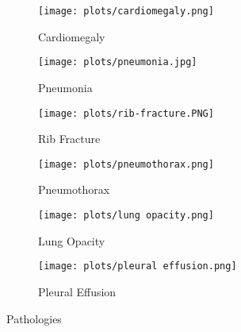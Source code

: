 \begin{figure}[htbp]
	\centering
	\begin{subfigure}[t]{0.3\textwidth}
		\texttt{[image: plots/cardiomegaly.png]}
		\caption{Cardiomegaly}
	\end{subfigure}
	\hfill
	\begin{subfigure}[t]{0.3\textwidth}
		\texttt{[image: plots/pneumonia.jpg]}
		\caption{Pneumonia}
	\end{subfigure}
	\hfill
	\begin{subfigure}[t]{0.3\textwidth}
		\texttt{[image: plots/rib-fracture.PNG]}
		\caption{Rib Fracture}
	\end{subfigure}
	\hfill
	\vskip 1pt
	\begin{subfigure}[t]{0.3\textwidth}
		\texttt{[image: plots/pneumothorax.png]}
		\caption{Pneumothorax}
	\end{subfigure}
	\hfill
	\begin{subfigure}[t]{0.3\textwidth}
		\texttt{[image: plots/lung opacity.png]}
		\caption{Lung Opacity}
	\end{subfigure}
	\hfill
	\begin{subfigure}[t]{0.3\textwidth}
		\texttt{[image: plots/pleural effusion.png]}
		\caption{Pleural Effusion}
	\end{subfigure}	
	\caption{Pathologies}
	\label{fig-pathologies}
	\end{figure}
